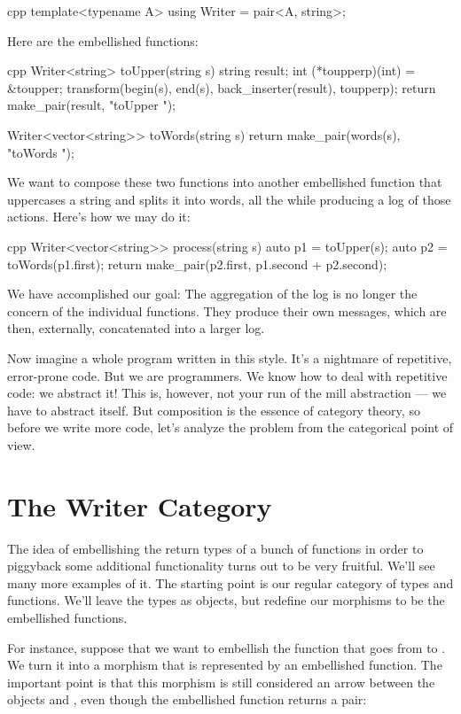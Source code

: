 \begin{snip}{cpp}
template<typename A>
using Writer = pair<A, string>;
\end{snip}
Here are the embellished functions:

\begin{snip}{cpp}
Writer<string> toUpper(string s) {
    string result;
    int (*toupperp)(int) = &toupper;
    transform(begin(s), end(s), back_inserter(result), toupperp);
    return make_pair(result, "toUpper ");
}

Writer<vector<string>> toWords(string s) {
    return make_pair(words(s), "toWords ");
}
\end{snip}
We want to compose these two functions into another embellished function
that uppercases a string and splits it into words, all the while
producing a log of those actions. Here's how we may do it:

\begin{snip}{cpp}
Writer<vector<string>> process(string s) {
    auto p1 = toUpper(s);
    auto p2 = toWords(p1.first);
    return make_pair(p2.first, p1.second + p2.second);
}
\end{snip}
We have accomplished our goal: The aggregation of the log is no longer
the concern of the individual functions. They produce their own
messages, which are then, externally, concatenated into a larger log.

Now imagine a whole program written in this style. It's a nightmare of
repetitive, error-prone code. But we are programmers. We know how to
deal with repetitive code: we abstract it! This is, however, not your
run of the mill abstraction --- we have to abstract  itself. But composition is the essence of category theory,
so before we write more code, let's analyze the problem from the
categorical point of view.

\section{The Writer Category}

The idea of embellishing the return types of a bunch of functions in
order to piggyback some additional functionality turns out to be very
fruitful. We'll see many more examples of it. The starting point is our
regular category of types and functions. We'll leave the types as
objects, but redefine our morphisms to be the embellished functions.

For instance, suppose that we want to embellish the function
 that goes from  to . We turn it
into a morphism that is represented by an embellished function. The
important point is that this morphism is still considered an arrow
between the objects  and , even though the
embellished function returns a pair:

